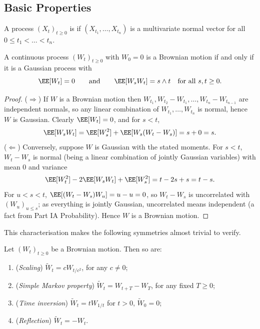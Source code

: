 \subsection{Basic Properties}

\begin{definition}
	A process $(X_t)_{t\geq0}$ is  if $(X_{t_1},\dots,X_{t_n})$ is a multivariate normal vector for all $0\leq t_1<\dots<t_n$.
\end{definition}

\begin{theorem}\label{thm:bm-gaussian}
	A continuous process $(W_t)_{t\geq0}$ with $W_0 = 0$ is a Brownian motion if and only if it is a Gaussian process with
	$$
	\EE[W_t] = 0 \qquad\text{and}\qquad \EE[W_sW_t] = s\wedge t \quad \text{for all } s,t\geq0.
	$$
\end{theorem}

\begin{proof}
	($\Rightarrow$) If $W$ is a Brownian motion then $W_{t_1}, W_{t_2}-W_{t_1},\dots,W_{t_n}-W_{t_{n-1}}$ are independent normals, so any linear combination of $W_{t_1},\dots,W_{t_n}$ is normal, hence $W$ is Gaussian. Clearly $\EE[W_t]=0$, and for $s<t$,
	$$
	\EE[W_sW_t] = \EE[W_s^2] + \EE[W_s(W_t-W_s)] = s + 0 = s.
	$$
	($\Leftarrow$) Conversely, suppose $W$ is Gaussian with the stated moments. For $s<t$, $W_t - W_s$ is normal (being a linear combination of jointly Gaussian variables) with mean $0$ and variance
	$$
	\EE[W_t^2] - 2\EE[W_sW_t] + \EE[W_s^2] = t - 2s + s = t-s.
	$$
	For $u < s < t$, $\EE[(W_t-W_s)W_u] = u - u = 0$, so $W_t - W_s$ is uncorrelated with $(W_u)_{u\leq s}$; as everything is jointly Gaussian, uncorrelated means independent (a fact from Part IA Probability). Hence $W$ is a Brownian motion.
\end{proof}

This characterisation makes the following symmetries almost trivial to verify.

\begin{theorem}
	Let $(W_t)_{t\geq0}$ be a Brownian motion. Then so are:
	\begin{enumerate}[label=(\roman*)]
		\item (\emph{Scaling}) $\tilde W_t = cW_{t/c^2}$, for any $c \neq 0$;
		\item (\emph{Simple Markov property}) $\tilde W_t = W_{t+T}-W_T$, for any fixed $T \geq 0$;
		\item (\emph{Time inversion}) $\tilde W_t = tW_{1/t}$ for $t>0$, $\tilde W_0 = 0$;
		\item (\emph{Reflection}) $\tilde W_t = -W_t$.
	\end{enumerate}
\end{theorem}


